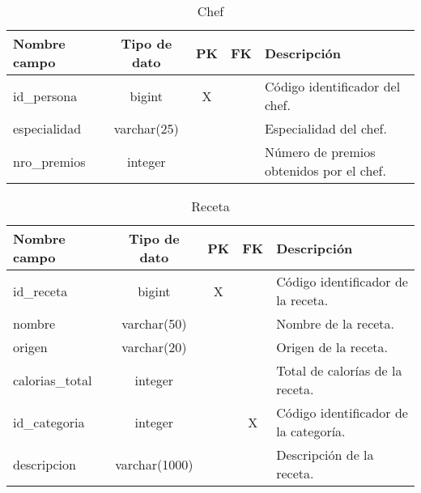 \documentclass[12pt,a4paper]{article}
\begin{document}
\begin{table}[h!]
\centering
\begin{tabular}{|l|c|c|c|l|}
\hline
\textbf{Nombre campo}      & \textbf{Tipo de dato} & \textbf{PK} & \textbf{FK} & \textbf{Descripción} \\
\hline
id\_persona                & bigint                & X           &             & Código identificador del chef. \\
especialidad               & varchar(25)           &             &             & Especialidad del chef. \\
nro\_premios               & integer               &             &             & Número de premios obtenidos por el chef. \\
\hline
\end{tabular}
\caption{Chef}
\label{table:chef}
\end{table}

\begin{table}[h!]
\centering
\begin{tabular}{|l|c|c|c|l|}
\hline
\textbf{Nombre campo}      & \textbf{Tipo de dato} & \textbf{PK} & \textbf{FK} & \textbf{Descripción} \\
\hline
id\_receta                 & bigint                & X           &             & Código identificador de la receta. \\
nombre                     & varchar(50)           &             &             & Nombre de la receta. \\
origen                     & varchar(20)           &             &             & Origen de la receta. \\
calorias\_total            & integer               &             &             & Total de calorías de la receta. \\
id\_categoria              & integer               &             & X           & Código identificador de la categoría. \\
descripcion                & varchar(1000)         &             &             & Descripción de la receta. \\
\hline
\end{tabular}
\caption{Receta}
\label{table:receta}
\end{table}
\end{document}
